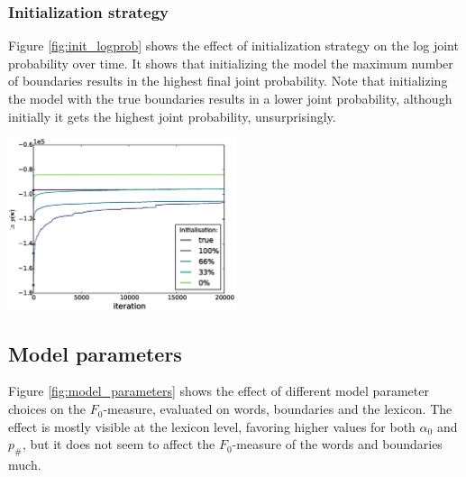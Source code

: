 \subsubsection{Initialization strategy}

Figure \ref{fig:init_logprob} shows the effect of initialization strategy on the log joint probability over time. It shows that initializing the model the maximum number of boundaries results in the highest final joint probability. Note that initializing the model with the true boundaries results in a lower joint probability, although initially it gets the highest joint probability, unsurprisingly.

\begingroup
    \centering
    \includegraphics[width=0.5\textwidth]{images/initialisation-log_prob}
    \label{fig:init_logprob}
\endgroup

\subsection{Model parameters}

Figure \ref{fig:model_parameters} shows the effect of different model parameter choices on the $F_0$-measure, evaluated on words, boundaries and the lexicon. The effect is mostly visible at the lexicon level, favoring higher values for both $\alpha_0$ and $p_\#$, but it does not seem to affect the $F_0$-measure of the words and boundaries much.

